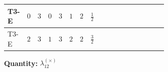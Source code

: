 \documentclass[8pt]{article}
\begin{document}
\begin{landscape}
\begin{longtable}{@{}llcccccc >{\raggedright\arraybackslash}p{0.21\linewidth} >{\raggedright\arraybackslash}p{0.21\linewidth} >{\raggedright\arraybackslash}p{0.21\linewidth}@{}}
T3-E & $0$ & $3$ & $0$ & $3$ & $1$ & $2$ & $\frac{1}{2}$ & \scriptsize\adjustbox{max width=\linewidth}{$\begin{gathered} {\lambda_{12}^{(1)}} \left(\frac{1}{2} T_{\nu}^{(1)}+\frac{1}{2} T_{\nu}^{(2)}+8 {\lambda_{12}^{(\times)}}+{\lambda_{S_1}^{(A)}}+{\lambda_{S_2}^{(A)}}\right)\end{gathered}$} & \scriptsize\adjustbox{max width=\linewidth}{$\begin{gathered} +{\lambda_{12}^{(\times)}} (2 T_{\nu}^{(1)}+2 T_{\nu}^{(2)})\end{gathered}$} & \scriptsize\adjustbox{max width=\linewidth}{$\begin{gathered} -\frac{7}{6} \operatorname{Tr}\!\left({y_1}\,\left({y_1}\right)^{\dagger}\,{y_2}\,\left({y_2}\right)^{\dagger}\right)\end{gathered}$} \\
\midrule
T3-E & $2$ & $3$ & $1$ & $3$ & $2$ & $2$ & $\frac{3}{2}$ & \scriptsize\adjustbox{max width=\linewidth}{$\begin{gathered} {\lambda_{12}^{(1)}} \left(\frac{1}{2} T_{\nu}^{(1)}+\frac{1}{2} T_{\nu}^{(2)}+8 {\lambda_{12}^{(\times)}}+{\lambda_{S_1}^{(A)}}+{\lambda_{S_2}^{(A)}}\right)\end{gathered}$} & \scriptsize\adjustbox{max width=\linewidth}{$\begin{gathered} +{\lambda_{12}^{(\times)}} (2 T_{\nu}^{(1)}+2 T_{\nu}^{(2)})\end{gathered}$} & \scriptsize\adjustbox{max width=\linewidth}{$\begin{gathered} -\frac{7}{6} \operatorname{Tr}\!\left({y_1}\,\left({y_1}\right)^{\dagger}\,{y_2}\,\left({y_2}\right)^{\dagger}\right)\end{gathered}$} \\
\midrule
\bottomrule
\end{longtable}
\clearpage
\noindent\textbf{Quantity: }$\lambda_{12}^{(\times)}$\par\smallskip

\end{landscape}
\end{document}
